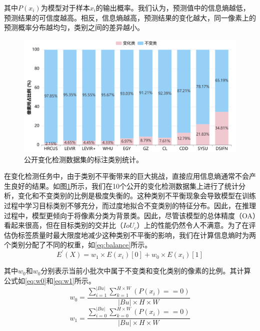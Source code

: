 \documentclass[lang=chs, degree=master, blindreview=false, adobe=false]{yanputhesis}
\begin{document}
其中$P\left(x_{i}\right)$为模型对于样本$x_{i}$的输出概率。我们认为，预测值中的信息熵越低，预测结果的可信度越高。相反，信息熵越高，预测结果的变化越大，同一像素上的预测概率分布越均匀，类别之间的差异越小。
\begin{figure}[htb]
  \centering
  \includegraphics[scale=0.25]{images/imbalance.png}
  \caption{
    公开变化检测数据集的标注类别统计。
  }
  \label{fig:Adasemicd_imbalance}
\end{figure}
在变化检测任务中，由于类别不平衡带来的巨大挑战，直接应用信息熵通常不会产生良好的结果。如图\ref{fig:Adasemicd_imbalance}所示，我们在10个公开的变化检测数据集上进行了统计分析，变化和不变类别的比例是极度失衡的。这种类别不平衡现象会导致模型在训练过程中学习目标类别不够充分，而过度地拟合不变类别的特征分布。因此，在推理过程中，模型更倾向于将像素分类为背景类。因此，尽管该模型的总体精度（OA）看起来很高，但在目标类别的交并比（$IoU_c$）上的性能仍然令人不满意。为了在评估伪标签质量时最大限度地减少这种类别不平衡的影响，我们在计算信息熵时为两个类别分配了不同的权重，如\autoref{eq:balance}所示。
\begin{equation}
  \label{eq:balance}
  E^{\prime}(X)=w_{1} \times E\left(x_{i}\right)[0]+w_{0} \times E\left(x_{i}\right)[1]
\end{equation}

其中$w_{0}$和$w_{0}$分别表示当前小批次中属于不变类和变化类别的像素的比例。其计算公式如\autoref{eq:w0}和\autoref{eq:w1}所示。
\begin{equation}
  \label{eq:w0}
  w_{0}=\frac{\sum_{i=1}^{|B u|} \sum_{k=1}^{H \times W}\left(P\left(x_{i}\right)==0\right)}{|B u| \times H \times W}
\end{equation}
\begin{equation}
  \label{eq:w1}
  w_{1}=\frac{\sum_{i=0}^{|B u|} \sum_{k=0}^{H \times W}\left(P\left(x_{i}\right)==0\right)}{|B u| \times H \times W}
\end{equation}
\end{document}
